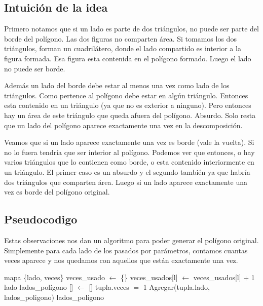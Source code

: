 \subsection{Intuición de la idea}
\par{Primero notamos que si un lado es parte de dos triángulos, no puede ser parte del borde del polígono. Las dos figuras no comparten área. Si tomamos los dos triángulos, forman un cuadrilátero, donde el lado compartido es interior a la figura formada. Esa figura esta contenida en el polígono formado. Luego el lado no puede ser borde.}
\par{Además un lado del borde debe estar al menos una vez como lado de los triángulos. Como pertence al polígono debe estar en algún triángulo. Entonces esta contenido en un triángulo (ya que no es exterior a ninguno). Pero entonces hay un área de este triángulo que queda afuera del polígono. Absurdo. Solo resta que un lado del polígono aparece exactamente una vez en la descomposición.}
\par{Veamos que si un lado aparece exactamente una vez es borde (vale la vuelta). Si no lo fuera tendría que ser interior al polígono. Podemos ver que entonces, o hay varios triángulos que lo contienen como borde, o esta contenido interiormente en un triángulo. El primer caso es un absurdo y el segundo también ya que habría dos triángulos que comparten área. Luego si un lado aparece exactamente una vez es borde del polígono original.}

\subsection{Pseudocodigo}

Estas observaciones nos dan un algoritmo para poder generar el polígono original. Simplemente para cada lado de los pasados por parámetros, contamos cuantas veces aparece y nos quedamos con aquellos que están exactamente una vez. \newline

\begin{algorithmic}

	\State mapa \{lado, veces\} veces_usado $\gets$ \{\}
			\State veces_usados[l] $\gets$ veces_usados[l] + 1
		\EndFor
	\EndFor 
	\State lado lados_polígono [] $\gets$ []
		\If tupla.veces $=$ 1
			\State Agregar(tupla.lado, lados_poligono)
		\EndIf
	\EndFor
	\State \Return lados_polígono
\EndFunction

\end{algorithmic}

